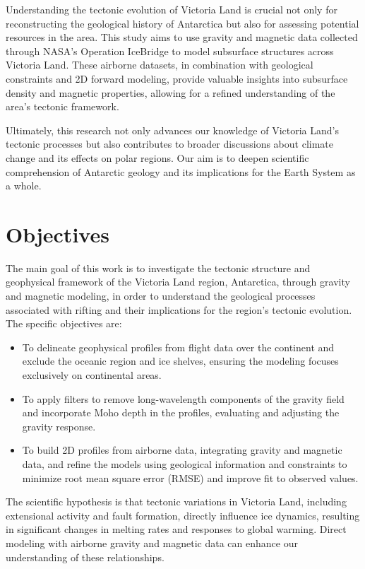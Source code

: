 \documentclass{article}
\begin{document}
	Understanding the tectonic evolution of Victoria Land is crucial not only for reconstructing the geological 
	history of Antarctica but also for assessing potential resources in the area. This study aims to use 
	gravity and magnetic data collected through NASA’s Operation IceBridge to model subsurface structures 
	across Victoria Land. These airborne datasets, in combination with geological constraints and 2D forward 
	modeling, provide valuable insights into subsurface density and magnetic properties, allowing for a refined 
	understanding of the area’s tectonic framework.
	
	Ultimately, this research not only advances our knowledge of Victoria Land's 
	tectonic processes but also contributes to broader discussions about climate 
	change and its effects on polar regions. Our aim is to deepen scientific comprehension 
	of Antarctic geology and its implications for the Earth System as a whole.


\section{Objectives}
\label{sec:objectives}
The main goal of this work is to investigate the tectonic structure and geophysical framework 
of the Victoria Land region, Antarctica, through gravity and magnetic modeling, in order to 
understand the geological processes associated with rifting and their implications for the 
region's tectonic evolution. The specific objectives are:
\begin{itemize}
  \item To delineate geophysical profiles from 
  flight data over the continent and exclude the 
  oceanic region and ice shelves, ensuring the 
  modeling focuses exclusively on continental areas.
  
  \item To apply filters to remove long-wavelength 
  components of the gravity field and incorporate Moho 
  depth in the profiles, evaluating and adjusting 
  the gravity response.
  
  \item To build 2D profiles from airborne data, 
  integrating gravity and magnetic data, and refine 
  the models using geological information and 
  constraints to minimize root mean square error 
  (RMSE) and improve fit to observed values.

\end{itemize}

The scientific hypothesis is that tectonic variations in Victoria Land, 
including extensional activity and fault formation, directly influence ice dynamics, 
resulting in significant changes in melting rates and responses to global warming. 
Direct modeling with airborne gravity and magnetic data can enhance our understanding of 
these relationships.
\end{document}
